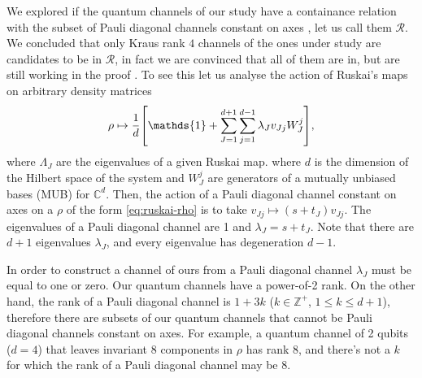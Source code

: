 \documentclass[11pt,dvipsnames]{article} %
\newcommand{\1}{\mathds{1}}
\begin{document}
We explored if the quantum channels of our study have a containance relation
with the subset of Pauli diagonal
channels constant on axes \cite{nathanson2007pauli}, let us call them
$\mathcal{R}$.  We concluded that only Kraus rank $4$ channels of the ones
under study are candidates to
be in $\mathcal{R}$, in fact we are convinced that all of them are in, but are
still working in the proof . To see this
let us analyse the action of Ruskai's maps on arbitrary density matrices
\begin{align}
	\rho \mapsto \frac{1}{d}\qty[\1 + \sum _{J=1}^{d+1} \sum _{j=1}^{d-1}
	\lambda_J v_{Jj}W_J^j],
	\label{eq:ruskai-rho}
\end{align}
where $\Lambda_J$ are the eigenvalues of a given Ruskai map.  where $d$
is the dimension of the Hilbert space of the system and $W_J^j$ 
are generators of a mutually unbiased bases (MUB) for $\mathbb{C}^{d}$.  Then,
the action of a Pauli diagonal channel constant on axes on a $\rho$ of the form
\eqref{eq:ruskai-rho} is to take $v_{Jj}\mapsto (s+t_J)v_{Jj}$. The eigenvalues
of a Pauli diagonal channel are 1 and $\lambda _J=s+t_J$. Note that there are
$d+1$ eigenvalues $\lambda_J$, and every eigenvalue has degeneration $d-1$. 

In order to construct a channel of ours from a 
Pauli diagonal channel $\lambda_J$ must be equal to one or zero. Our
quantum channels have a power-of-2 rank. On the other hand, 
the rank of a Pauli diagonal channel is $1+3k$ ($k\in \mathbb{Z}^+$,
$1\leq k\leq d+1$),
therefore there are subsets of our quantum channels that cannot be  
Pauli diagonal channels constant on axes. For example, a quantum channel of 2 qubits 
($d=4$) that leaves invariant 8 components in $\rho$ has rank 8, and
there's not a $k$ for which the rank of a Pauli diagonal channel may be 8.


\end{document}
